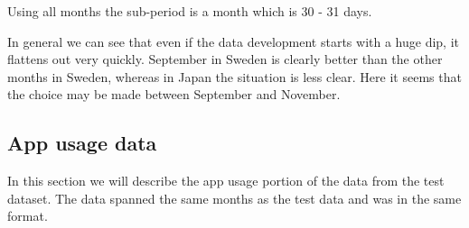 Using all months the sub-period is a month which is 30 - 31 days. 

In general we can see that even if the data development starts with a huge dip, it flattens out very quickly. September in Sweden is clearly better than the other months in Sweden, whereas in Japan the situation is less clear. Here it seems that the choice may be made between September and November. 



\subsection{App usage data}
In this section we will describe the app usage portion of the data from the test dataset.
The data spanned the same months as the test data and was in the same format.

